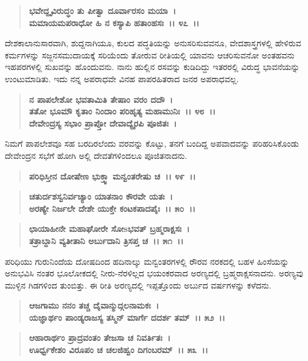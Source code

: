\begin{verse}
\textbf{ಭವೇದ್ದೃವಿರುದ್ಧಂ ತು ಪೀತ್ವಾ ದೂರ್ವಾರಸಂ ಮಯಾ~।}\\\textbf{ಮಮಾಯಮಪರಾಧೋ ಹಿ ನ ಕಸ್ಯಾಪಿ ಹತಾಂಹಸಃ~।। ೪೭~।।}
\end{verse}

ದೇಶಕಾಲಾನುಸಾರವಾಗಿ, ಶುದ್ದನಾಗಿಯೂ, ಕುಲದ ಪದ್ಧತಿಯನ್ನು ಅನುಸರಿಸುವವನೂ, ವೇದಶಾಸ್ತ್ರಗಳಲ್ಲಿ ಹೇಳಿರುವ ಕರ್ಮಗಳನ್ನು ಸಜ್ಜನಸಮುದಾಯಕ್ಕೆ ಸರಿಯೆಂದು ತೋರುವ ರೀತಿಯಲ್ಲಿ ಯಾವನು ಆಚರಿಸುವನೋ ಅಂತಹವನು ಇಹಪರಗಳಲ್ಲಿ ಸುಖವನ್ನು ಹೊಂದುವನು. ನಾನು ಹುಲ್ಲಿನ ರಸವನ್ನು ಕುಡಿದಿದ್ದು ಇತರರಲ್ಲಿ ವಿರುದ್ಧ ಭಾವನೆಯನ್ನು ಉಂಟುಮಾಡಿತು. ಇದು ನನ್ನ ಅಪರಾಧವೇ ವಿನಹ ಪಾಪರಹಿತರಾದ ಜನರ ಅಪರಾಧವಲ್ಲ.

\begin{verse}
\textbf{ನ ಪಾಪಲೇಶೋ ಭವತಾಮಿತಿ ತೇಷಾಂ ವರಂ ದದೌ~।}\\\textbf{ತತೋ ಭೂಮೌ ಕೃತಾಂ ನಿಂದಾಂ ಪರಿಹೃತ್ಯ ಮಹಾಮುನಿಃ~।। ೪೮~।।}\\\textbf{ದೇವೇಂದ್ರಸ್ಯ ಸಭಾಂ ಪ್ರಾಪ್ತೋ ದೇವಾದ್ಯೈರಪಿ ಪೂಜಿತಃ~।}
\end{verse}

ನಿಮಗೆ ಪಾಪಲೇಶವೂ ಸಹ ಬರದಿರಲೆಂದು ವರವನ್ನು ಕೊಟ್ಟು, ತನಗೆ ಬಂದಿದ್ದ ಅಪವಾದವನ್ನು ಪರಿಹರಿಸಿಕೊಂಡು ದೇವೇಂದ್ರನ ಸಭೆಗೆ ಹೋಗಿ ಅಲ್ಲಿ ದೇವತೆಗಳಿಂದಲೂ ಪೂಜಿತನಾದನು.

\begin{verse}
\textbf{ಪರಿಧಿಸ್ತೀನ ದೋಷೇಣ ಭುಕ್ತ್ವಾ ಮನ್ವಂತರೇಷು ಚ~।। ೪೯~।।}
\end{verse}

\begin{verse}
\textbf{ಚತುರ್ದಶಸ್ವನಿರ್ವಚ್ಯಾಂ ಯಾತನಾಂ ಕೌರವೇ ಯತಃ~।}\\\textbf{ಅರಣ್ಯೇ ನಿರ್ಜಲೇ ದೇಶೇ ಯುಕ್ತೇ ಕಂಟಕಪಾದಪೈಃ~।। ೫೦~।।}
\end{verse}

\begin{verse}
\textbf{ಛಾಯಾಹೀನೇ ಮಹಾಘೋರೇ ಸೋsಭವತ್ ಬ್ರಹ್ಮರಾಕ್ಷಸಃ~।}\\\textbf{ತತ್ರಾಬ್ದಾನಿ ವ್ಯತೀತಾನಿ ಅರ್ಬುದಾನಿ ತ್ರಿಸಪ್ತ ಚ~।। ೫೧~।।}
\end{verse}

ಪರಿಧಿಯು ಗುರುನಿಂದೆಯ ದೋಷದಿಂದ ಹದಿನಾಲ್ಕು ಮನ್ವಂತರಗಳಲ್ಲಿ ರೌರವ ನರಕದಲ್ಲಿ ಬಹಳ ಹಿಂಸೆಯನ್ನು ಅನುಭವಿಸಿ ನಂತರ ಭೂಲೋಕದಲ್ಲಿ ನೀರು-ನೆರಳಿಲ್ಲದ ಭಯಂಕರವಾದ ಅರಣ್ಯದಲ್ಲಿ ಬ್ರಹ್ಮರಾಕ್ಷಸನಾದನು. ಅರಣ್ಯವು ಮುಳ್ಳಿನ ಗಿಡಗಳಿಂದ ತುಂಬಿತ್ತು. ಈ ರೀತಿ ಅರಣ್ಯದಲ್ಲಿ ಇಪ್ಪತ್ತೊಂದು ಅರ್ಬುದ ವರ್ಷಗಳನ್ನು ಕಳೆದನು.

\begin{verse}
\textbf{ಆಜಗಾಮು ನನಂ ತಚ್ಚ ದೈವಾನ್ಮುದ್ಗಲನಾಮಕಃ~।}\\\textbf{ಯಜ್ಞಾರ್ಥಂ ಪಾಂಡ್ಯರಾಜಸ್ಯ ತಸ್ಮಿನ್ ಮಾರ್ಗೆ ದದರ್ಶ ತಮ್~।। ೫೨~।। }
\end{verse}

\begin{verse}
\textbf{ಆಹಾರಾರ್ಥಂ ಪ್ರಾದ್ರವಂತಂ ತೇಜಸಾ ಚ ನಿವರ್ತಿತಃ~।}\\\textbf{ಊರ್ಧ್ವಕೇಶಂ ವಿರೂಪಂ ಚ ಚಲಜಿಹ್ವಂ ದಿಗಂಬರಮ್~।। ೫೩~।।}
\end{verse}

